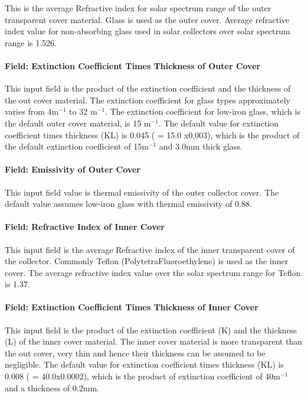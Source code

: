 This is the average Refractive index for solar spectrum range of the outer transparent cover material. Glass is used as the outer cover. Average refractive index value for non-absorbing glass used in solar collectors over solar spectrum range is 1.526.

\paragraph{Field: Extinction Coefficient Times Thickness of Outer Cover}\label{field-extinction-coefficient-times-thickness-of-outer-cover}

This input field is the product of the extinction coefficient and the thickness of the out cover material. The extinction coefficient for glass types approximately varies from 4m\(^{-1}\) to 32 m\(^{-1}\). The extinction coefficient for low-iron glass, which is the default outer cover material, is 15 m\(^{-1}\). The default value for extinction coefficient times thickness (KL) is 0.045 ( = 15.0 x0.003), which is the product of the default extinction coefficient of 15m\(^{-1}\) and 3.0mm thick glass.

\paragraph{Field: Emissivity of Outer Cover}\label{field-emissivity-of-outer-cover}

This input field value is thermal emissivity of the outer collector cover. The default value assumes low-iron glass with thermal emissivity of 0.88.

\paragraph{Field: Refractive Index of Inner Cover}\label{field-refractive-index-of-inner-cover}

This input field is the average Refractive index of the inner transparent cover of the collector. Commonly Teflon (PolytetraFluoroethylene) is used as the inner cover. The average refractive index value over the solar spectrum range for Teflon is 1.37.

\paragraph{Field: Extinction Coefficient Times Thickness of Inner Cover}\label{field-extinction-coefficient-times-thickness-of-inner-cover}

This input field is the product of the extinction coefficient (K) and the thickness (L) of the inner cover material. The inner cover material is more transparent than the out cover, very thin and hence their thickness can be assumed to be negligible. The default value for extinction coefficient times thickness (KL) is 0.008 ( = 40.0x0.0002), which is the product of extinction coefficient of 40m\(^{-1}\) and a thickness of 0.2mm.

